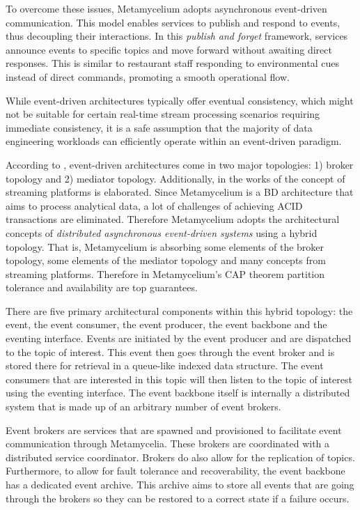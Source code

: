 \documentclass[preprint,12pt]{elsarticle}
\begin{document}
To overcome these issues, Metamycelium adopts asynchronous event-driven communication. This model enables services to publish and respond to events, thus decoupling their interactions. In this \emph{publish and forget} framework, services announce events to specific topics and move forward without awaiting direct responses. This is similar to restaurant staff responding to environmental cues instead of direct commands, promoting a smooth operational flow.

While event-driven architectures typically offer eventual consistency, which might not be suitable for certain real-time stream processing scenarios requiring immediate consistency, it is a safe assumption that the majority of data engineering workloads can efficiently operate within an event-driven paradigm.

According to \citeauthor{richards2020fundamentals}, event-driven architectures come in two major topologies: 1) broker topology and 2) mediator topology. Additionally, in the works of \citeauthor{stopford2018designing} the concept of streaming platforms is elaborated. Since Metamycelium is a BD architecture that aims to process analytical data, a lot of challenges of achieving ACID transactions are eliminated. Therefore Metamycelium adopts the architectural concepts of \emph{distributed asynchronous event-driven systems} using a hybrid topology. That is, Metamycelium is absorbing some elements of the broker topology, some elements of the mediator topology and many concepts from streaming platforms. Therefore in Metamycelium's CAP theorem \cite{brewer2000towards} partition tolerance and availability are top guarantees. 

There are five primary architectural components within this hybrid topology: the event, the event consumer, the event producer, the event backbone and the eventing interface. Events are initiated by the event producer and are dispatched to the topic of interest. This event then goes through the event broker and is stored there for retrieval in a queue-like indexed data structure. The event consumers that are interested in this topic will then listen to the topic of interest using the eventing interface. The event backbone itself is internally a distributed system that is made up of an arbitrary number of event brokers. 

Event brokers are services that are spawned and provisioned to facilitate event communication through Metamycelia. These brokers are coordinated with a distributed service coordinator. Brokers do also allow for the replication of topics. Furthermore, to allow for fault tolerance and recoverability, the event backbone has a dedicated event archive. This archive aims to store all events that are going through the brokers so they can be restored to a correct state if a failure occurs. 
\end{document}
